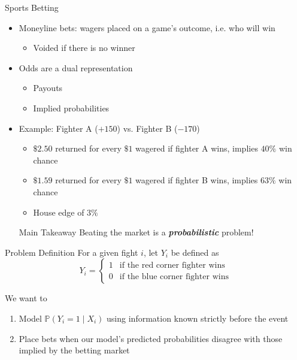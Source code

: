 \documentclass[aspectratio=169,xcolor=dvipsnames]{beamer}
\begin{document}
\begin{frame}{Sports Betting}
    \begin{itemize}
        \item Moneyline bets: wagers placed on a game’s outcome, i.e. who will win
        \begin{itemize}
            \item Voided if there is no winner
        \end{itemize}

        \item Odds are a dual representation
        \begin{itemize}
            \item Payouts

            \item Implied probabilities
        \end{itemize}

        \item Example: Fighter A ($+150$) vs. Fighter B ($-170$)
        \begin{itemize}
            \item $\$2.50$ returned for every $\$1$ wagered if fighter A wins, implies $40\%$ win chance

            \item $\$1.59$ returned for every $\$1$ wagered if fighter B wins, implies $63\%$ win chance

            \item House edge of $3\%$
        \end{itemize}

        \begin{alertblock}{Main Takeaway}
            Beating the market is a \textit{\textbf{probabilistic}} problem!
        \end{alertblock}
    \end{itemize}
\end{frame}


\begin{frame}{Problem Definition}
    For a given fight $i$, let $Y_i$ be defined as
    $$Y_i = \begin{cases}
        1 & \text{if the red corner fighter wins} \\
        0 & \text{if the blue corner fighter wins}
    \end{cases}$$

    We want to
    \begin{enumerate}
        \item Model $\mathbb{P}(Y_i = 1 \mid X_i)$ using information known strictly before the event

        \item Place bets when our model's predicted probabilities disagree with those implied by the betting market
    \end{enumerate}
\end{frame}
\end{document}
